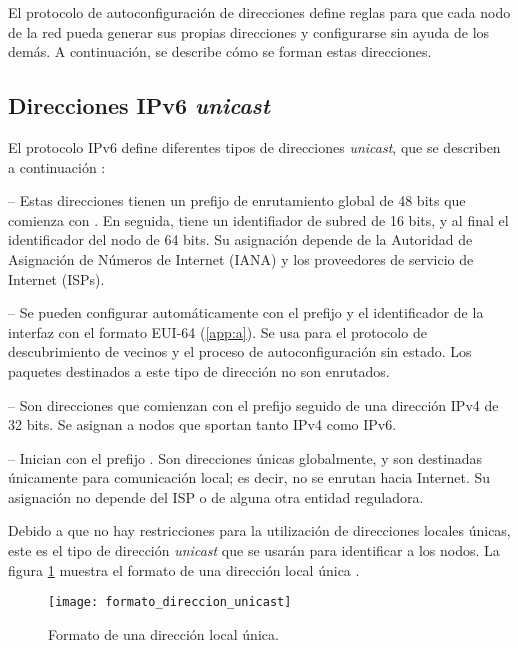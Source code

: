 El protocolo de autoconfiguración de direcciones define reglas para que cada
nodo de la red pueda generar sus propias direcciones y configurarse sin ayuda de
los demás. A continuación, se describe cómo se forman estas direcciones.

\subsection{Direcciones IPv6 \textit{unicast}}
\label{subsec:direcciones_unicast}

El protocolo IPv6 define diferentes tipos de direcciones \textit{unicast}, que
se describen a continuación \cite{CiscoIpv62011}:

 -- Estas direcciones tienen un prefijo de
enrutamiento global de 48 bits que comienza con . En seguida,
tiene un identifiador de subred de  16 bits, y al final el identificador del
nodo de 64 bits. Su asignación depende de la Autoridad de Asignación de Números
de Internet (IANA) y los proveedores de servicio de Internet (ISPs).

 --  Se pueden configurar automáticamente con
el prefijo  y el identificador de la interfaz con el formato
EUI-64 (\ref{app:a}). Se usa para el protocolo de descubrimiento de vecinos y
el proceso de autoconfiguración sin estado. Los paquetes destinados a este tipo de
dirección no son enrutados.

 -- Son direcciones que comienzan con el
prefijo  seguido de una dirección IPv4 de 32 bits. Se asignan a
nodos que sportan tanto IPv4 como IPv6.

 -- Inician con el prefijo . Son
direcciones únicas globalmente, y son destinadas únicamente para comunicación
local; es decir, no se enrutan hacia Internet. Su asignación no depende del ISP
o de alguna otra entidad reguladora.

Debido a que no hay restricciones para la utilización de direcciones locales
únicas, este es el tipo de dirección \textit{unicast} que se usarán para
identificar a los nodos. La figura \ref{fig:formato_direccion_unicast}
muestra el formato de una dirección local única \cite{CiscoIpv62011}.

\begin{figure}[th!]
\centering
\texttt{[image: formato\_direccion\_unicast]}
\decoRule
\caption[Formato de una dirección local única]{Formato de una dirección
local única.}
\label{fig:formato_direccion_unicast}
\end{figure}

